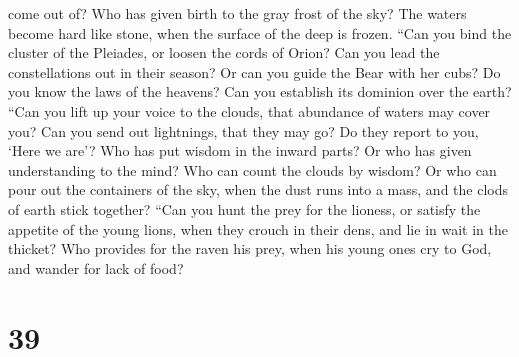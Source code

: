 come out of? Who has given birth to the gray frost of the sky?
 The waters become hard like stone, when the surface of
the deep is frozen.  ``Can you bind the cluster of the
Pleiades, or loosen the cords of Orion?  Can you lead the
constellations out in their season? Or can you guide the Bear with her
cubs?  Do you know the laws of the heavens? Can you
establish its dominion over the earth?  ``Can you lift up
your voice to the clouds, that abundance of waters may cover you?
 Can you send out lightnings, that they may go? Do they
report to you, `Here we are'?  Who has put wisdom in the
inward parts? Or who has given understanding to the mind?
 Who can count the clouds by wisdom? Or who can pour out
the containers of the sky,  when the dust runs into a
mass, and the clods of earth stick together?  ``Can you
hunt the prey for the lioness, or satisfy the appetite of the young
lions,  when they crouch in their dens, and lie in wait
in the thicket?  Who provides for the raven his prey,
when his young ones cry to God, and wander for lack of food?

\hypertarget{section-38}{%
\section{39}\label{section-38}}

